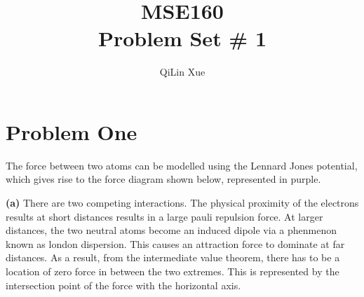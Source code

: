 \documentclass{article}
\title{MSE160 \\ Problem Set \# 1}
\author{QiLin Xue}
\begin{document}
    \maketitle
    \section*{Problem One}
    The force between two atoms can be modelled using the Lennard Jones potential, which gives rise to the force diagram shown below, represented in purple.
    \begin{center}
    \end{center}
    \textbf{(a)} There are two competing interactions. The physical proximity of the electrons results at short distances results in a large pauli repulsion force. At larger distances, the two neutral atoms become an induced dipole via a phenmenon known as london dispersion. This causes an attraction force to dominate at far distances. As a result, from the intermediate value theorem, there has to be a location of zero force in between the two extremes. This is represented by the intersection point of the force with the horizontal axis.
    \vspace{2mm}
\end{document}
